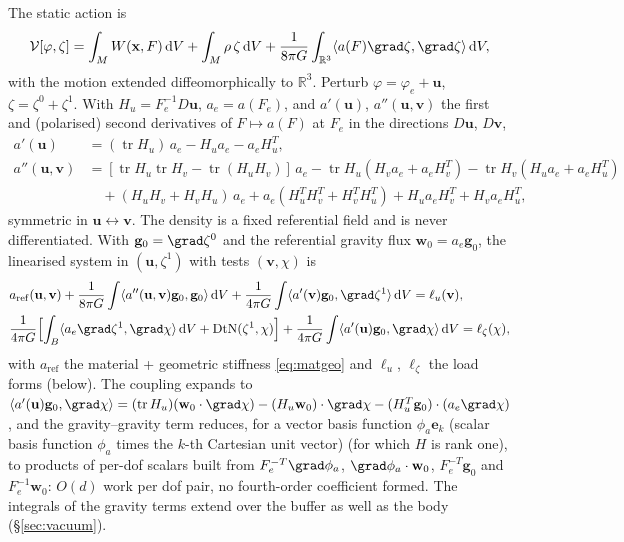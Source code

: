 \documentclass[11pt]{article}
\numberwithin{equation}{section}
\theoremstyle{remark}
\newcommand{\R}{\mathbb{R}}
\newcommand{\dV}{\,\mathrm{d}V}
\newcommand{\tr}{\operatorname{tr}}
\newcommand{\DtN}{\mathrm{DtN}}
\newcommand{\vu}{\mathbf{u}}
\newcommand{\vv}{\mathbf{v}}
\newcommand{\vw}{\mathbf{w}}
\newcommand{\vg}{\mathbf{g}}
\newcommand{\vx}{\mathbf{x}}
\begin{document}
The static action \cite{MaitraAlAttar2024} is
\begin{equation}
  \mathcal{V}[\varphi,\zeta] = \int_M W(\vx,F)\dV + \int_M\rho\,\zeta\dV
  + \frac{1}{8\pi G}\int_{\R^3}\langle a(F)\grad\zeta,\grad\zeta\rangle\dV,
\end{equation}
with the motion extended diffeomorphically to $\R^3$. Perturb $\varphi =
\varphi_e + \vu$, $\zeta = \zeta^0 + \zeta^1$. With $H_u = F_e^{-1}D\vu$,
$a_e = a(F_e)$, and $a'(\vu)$, $a''(\vu,\vv)$ the first and (polarised)
second derivatives of $F\mapsto a(F)$ at $F_e$ in the directions $D\vu$,
$D\vv$,
\begin{align}
  a'(\vu) &= (\tr H_u)\,a_e - H_ua_e - a_eH_u^T, \\
  a''(\vu,\vv) &= [\tr H_u\tr H_v - \tr(H_uH_v)]\,a_e
     - \tr H_u(H_va_e + a_eH_v^T) - \tr H_v(H_ua_e + a_eH_u^T) \nonumber\\
  &\quad + (H_uH_v + H_vH_u)\,a_e + a_e(H_u^TH_v^T + H_v^TH_u^T)
     + H_ua_eH_v^T + H_va_eH_u^T ,
\end{align}
symmetric in $\vu\leftrightarrow\vv$. The density is a fixed referential
field and is never differentiated. With $\vg_0 = \grad\zeta^0$ and the
referential gravity flux $\vw_0 = a_e\vg_0$, the linearised system in
$(\vu,\zeta^1)$ with tests $(\vv,\chi)$ is
\begin{align}
  &a_{\mathrm{ref}}(\vu,\vv)
   + \frac{1}{8\pi G}\int\langle a''(\vu,\vv)\vg_0,\vg_0\rangle\dV
   + \frac{1}{4\pi G}\int\langle a'(\vv)\vg_0,\grad\zeta^1\rangle\dV
   = \ell_u(\vv), \label{eq:refu}\\
  &\frac{1}{4\pi G}\Bigl[\int_B\langle a_e\grad\zeta^1,\grad\chi\rangle\dV
     + \DtN(\zeta^1,\chi)\Bigr]
   + \frac{1}{4\pi G}\int\langle a'(\vu)\vg_0,\grad\chi\rangle\dV
   = \ell_\zeta(\chi), \label{eq:refz}
\end{align}
with $a_{\mathrm{ref}}$ the material + geometric stiffness \eqref{eq:matgeo}
and $\ell_u$, $\ell_\zeta$ the load forms (below).
The coupling expands to
$\langle a'(\vu)\vg_0,\grad\chi\rangle = (\tr H_u)(\vw_0\cdot\grad\chi)
- (H_u\vw_0)\cdot\grad\chi - (H_u^T\vg_0)\cdot(a_e\grad\chi)$, and the
gravity--gravity term reduces, for a vector basis function
$\phi_a\mathbf{e}_k$ (scalar basis function $\phi_a$ times the $k$-th
Cartesian unit vector)
(for which $H$ is rank one), to products of per-dof scalars built from
$F_e^{-T}\grad\phi_a$, $\grad\phi_a\cdot\vw_0$, $F_e^{-T}\vg_0$ and
$F_e^{-1}\vw_0$: $O(d)$ work per dof pair, no fourth-order coefficient
formed. The integrals of the gravity terms extend over the buffer as well
as the body (\S\ref{sec:vacuum}).
\end{document}
